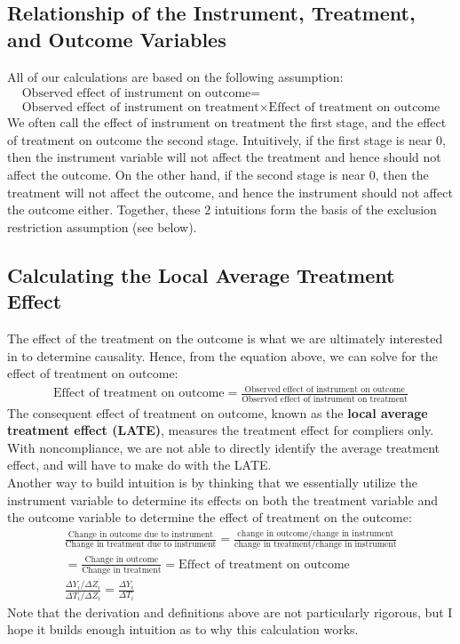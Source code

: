 \documentclass{article}
\begin{document}
\subsection{Relationship of the Instrument, Treatment, and Outcome Variables}
All of our calculations are based on the following assumption: 
\begin{gather*}
\textrm{Observed effect of instrument on outcome} = \\\textrm{Observed effect of instrument on treatment} \times \textrm{Effect of treatment on outcome}
\end{gather*}
We often call the effect of instrument on treatment the first stage, and the effect of treatment on outcome the second stage. Intuitively, if the first stage is near 0, then the instrument variable will not affect the treatment and hence should not affect the outcome.
On the other hand, if the second stage is near 0, then the treatment will not affect the outcome, and hence the instrument should not affect the outcome either. 
Together, these 2 intuitions form the basis of the exclusion restriction assumption (see below).  


\subsection{Calculating the Local Average Treatment Effect}
The effect of the treatment on the outcome is what we are ultimately interested in to determine causality.
Hence, from the equation above, we can solve for the effect of treatment on outcome:
\begin{gather*}
\textrm{Effect of treatment on outcome} = \frac{\textrm{Observed effect of instrument on outcome}}{\textrm{Observed effect of instrument on treatment}}
\end{gather*}
The consequent effect of treatment on outcome, known as the \textbf{local average treatment effect (LATE)}, measures the treatment effect for compliers only. 
With noncompliance, we are not able to directly identify the average treatment effect, and will have to make do with the LATE.
\\
Another way to build intuition is by thinking that we essentially utilize the instrument variable to determine its effects on both the treatment variable and the outcome variable to determine the effect of treatment on the outcome:
\begin{gather*}
\frac{\text{Change in outcome due to instrument}}{\text{Change in treatment due to instrument}} = \frac{\text{change in outcome} / \text{change in instrument}}{\text{change in treatment} / \text{change in instrument}} \\= \frac{\text{Change in outcome}}{\text{Change in treatment}} = \text{Effect of treatment on outcome} \\
\frac{\Delta Y_i/\Delta Z_i}{\Delta T_i/ \Delta Z_i} = \frac{\Delta Y_i}{\Delta T_i}
\end{gather*}
Note that the derivation and definitions above are not particularly rigorous, but I hope it builds enough intuition as to why this calculation works.
\end{document}
